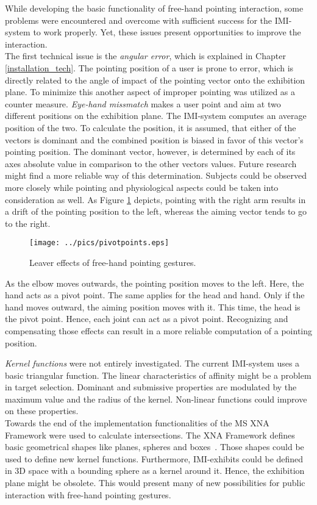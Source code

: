 While developing the basic functionality of free-hand pointing interaction, some problems were encountered and overcome with sufficient success for the \ac{IMI}-system to work properly. Yet, these issues present opportunities to improve the interaction.
\\
The first technical issue is the \textit{angular error}, which is explained in Chapter \ref{installation_tech}. The pointing position of a user is prone to error, which is directly related to the angle of impact of the pointing vector onto the exhibition plane. To minimize this another aspect of improper pointing was utilized as a counter measure. \textit{Eye-hand missmatch} makes a user point and aim at two different positions on the exhibition plane. The \ac{IMI}-system computes an average position of the two. To calculate the position, it is assumed, that either of the vectors is dominant and the combined position is biased in favor of this vector's pointing position. The dominant vector, however, is determined by each of its axes absolute value in comparison to the other vectors values. Future research might find a more reliable way of this determination. Subjects could be observed more closely while pointing and physiological aspects could be taken into consideration as well. As Figure \ref{fig:dominant_pointing} depicts, pointing with the right arm results in a drift of the pointing position to the left, whereas the aiming vector tends to go to the right.
\begin{figure}[H]%
\texttt{[image: ../pics/pivotpoints.eps]}%
\caption{Leaver effects of free-hand pointing gestures.}%
\label{fig:dominant_pointing} %
\end{figure}
As the elbow moves outwards, the pointing position moves to the left. Here, the hand acts as a pivot point. The same applies for the head and hand. Only if the hand moves outward, the aiming position moves with it. This time, the head is the pivot point. Hence, each joint can act as a pivot point. Recognizing and compensating those effects can result in a more reliable computation of a pointing position. 

\textit{Kernel functions} were not entirely investigated. The current \ac{IMI}-system uses a basic triangular function. The linear characteristics of affinity might be a problem in target selection. Dominant and submissive properties are modulated by the maximum value and the radius of the kernel. Non-linear functions could improve on these properties.
\\
Towards the end of the implementation functionalities of the \ac{MS} XNA Framework were used to calculate intersections. The XNA Framework defines basic geometrical shapes like planes, spheres and boxes~\cite{MSXNA}. Those shapes could be used to define new kernel functions. Furthermore, \ac{IMI}-exhibits could be defined in \ac{3D} space with a bounding sphere as a kernel around it. Hence, the exhibition plane might be obsolete. This would present many of new possibilities for public interaction with free-hand pointing gestures.

